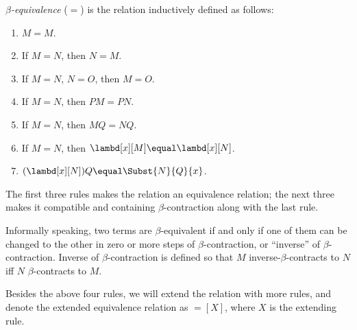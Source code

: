 \documentclass[../../../include/open-logic-section]{subfiles}
\begin{document}
\begin{defn}
  \emph{$\beta$-equivalence} ($\equal$) is the relation inductively
  defined as follows:
  \begin{enumerate}
  \item $M \equal M$.
  \item If $M \equal N$, then $N \equal M$.
  \item If $M \equal N$, $N \equal O$, then $M \equal O$.
  \item If $M \equal N$, then $PM \equal PN$.
  \item If $M \equal N$, then $MQ \equal NQ$.
  \item If $M \equal N$, then $\lambd[x][M] \equal \lambd[x][N]$.
  \item $(\lambd[x][N])Q \equal \Subst{N}{Q}{x}$.
  \end{enumerate}
\end{defn}
The first three rules makes the relation an equivalence relation; the
next three makes it compatible and containing $\beta$-contraction
along with the last rule.

Informally speaking, two terms are $\beta$-equivalent if and only if
one of them can be changed to the other in zero or more steps of
$\beta$-contraction, or ``inverse'' of $\beta$-contraction. Inverse of
$\beta$-contraction is defined so that $M$ inverse-$\beta$-contracts to $N$
iff $N$ $\beta$-contracts to $M$.

Besides the above four rules, we will extend the relation with more
rules, and denote the extended equivalence relation as $\equal[X]$,
where $X$ is the extending rule.
\end{document}
